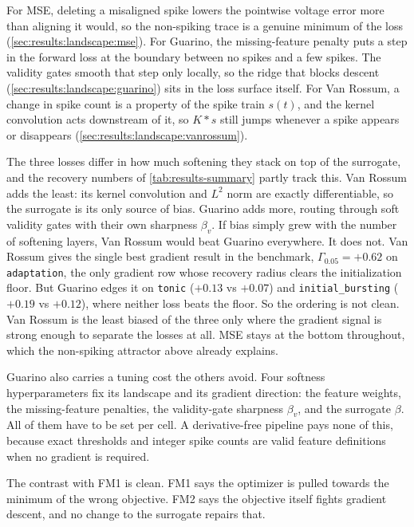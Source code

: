 For \gls{MSE}, deleting a misaligned spike lowers the pointwise voltage error more than aligning it would, so the non-spiking trace is a genuine minimum of the loss (\cref{sec:results:landscape:mse}).
For Guarino, the missing-feature penalty puts a step in the forward loss at the boundary between no spikes and a few spikes.
The validity gates smooth that step only locally, so the ridge that blocks descent (\cref{sec:results:landscape:guarino}) sits in the loss surface itself.
For Van Rossum, a change in spike count is a property of the spike train $s(t)$, and the kernel convolution acts downstream of it, so $K\ast s$ still jumps whenever a spike appears or disappears (\cref{sec:results:landscape:vanrossum}).

The three losses differ in how much softening they stack on top of the surrogate, and the recovery numbers of \cref{tab:results-summary} partly track this.
Van Rossum adds the least: its kernel convolution and $L^2$ norm are exactly differentiable, so the surrogate is its only source of bias.
Guarino adds more, routing through soft validity gates with their own sharpness $\beta_v$.
If bias simply grew with the number of softening layers, Van Rossum would beat Guarino everywhere.
It does not.
Van Rossum gives the single best gradient result in the benchmark, $\Gamma_{0.05}=+0.62$ on \texttt{adaptation}, the only gradient row whose recovery radius clears the initialization floor.
But Guarino edges it on \texttt{tonic} ($+0.13$ vs $+0.07$) and \texttt{initial\_bursting} ($+0.19$ vs $+0.12$), where neither loss beats the floor.
So the ordering is not clean.
Van Rossum is the least biased of the three only where the gradient signal is strong enough to separate the losses at all.
\gls{MSE} stays at the bottom throughout, which the non-spiking attractor above already explains.

Guarino also carries a tuning cost the others avoid.
Four softness hyperparameters fix its landscape and its gradient direction: the feature weights, the missing-feature penalties, the validity-gate sharpness $\beta_v$, and the surrogate $\beta$.
All of them have to be set per cell.
A derivative-free pipeline pays none of this, because exact thresholds and integer spike counts are valid feature definitions when no gradient is required.

The contrast with FM1 is clean.
FM1 says the optimizer is pulled towards the minimum of the wrong objective.
FM2 says the objective itself fights gradient descent, and no change to the surrogate repairs that.

